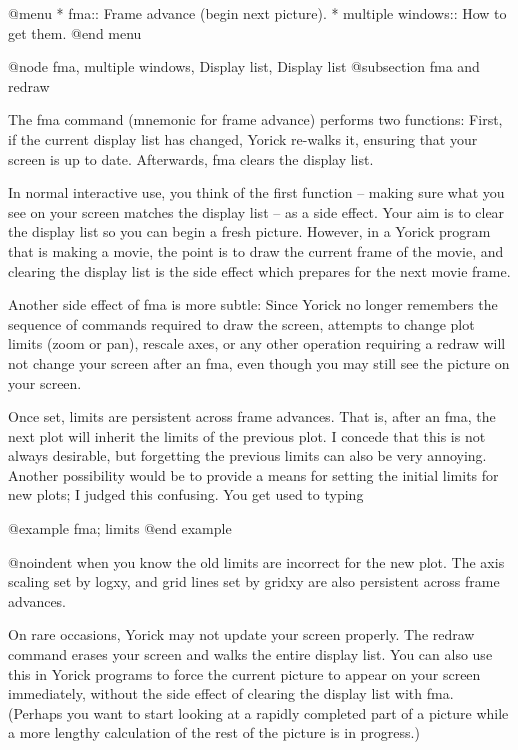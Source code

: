 @menu
* fma::                         Frame advance (begin next picture).
* multiple windows::            How to get them.
@end menu

@node fma, multiple windows, Display list, Display list
@subsection fma and redraw

The fma command (mnemonic for frame advance) performs two functions:
First, if the current display list has changed, Yorick re-walks it,
ensuring that your screen is up to date.  Afterwards, fma clears the
display list.

In normal interactive use, you think of the first function -- making
sure what you see on your screen matches the display list -- as a side
effect.  Your aim is to clear the display list so you can begin a
fresh picture.  However, in a Yorick program that is making a movie,
the point is to draw the current frame of the movie, and clearing the
display list is the side effect which prepares for the next movie
frame.

Another side effect of fma is more subtle: Since Yorick no longer
remembers the sequence of commands required to draw the screen,
attempts to change plot limits (zoom or pan), rescale axes, or any
other operation requiring a redraw will not change your screen after
an fma, even though you may still see the picture on your screen.

Once set, limits are persistent across frame advances.  That is, after
an fma, the next plot will inherit the limits of the previous plot.  I
concede that this is not always desirable, but forgetting the previous
limits can also be very annoying.  Another possibility would be to
provide a means for setting the initial limits for new plots; I judged
this confusing.  You get used to typing

@example
fma; limits
@end example

@noindent
when you know the old limits are incorrect for the new plot.  The axis
scaling set by logxy, and grid lines set by gridxy are also persistent
across frame advances.

On rare occasions, Yorick may not update your screen properly.  The
redraw command erases your screen and walks the entire display list.
You can also use this in Yorick programs to force the current picture
to appear on your screen immediately, without the side effect of
clearing the display list with fma.  (Perhaps you want to start
looking at a rapidly completed part of a picture while a more lengthy
calculation of the rest of the picture is in progress.)


